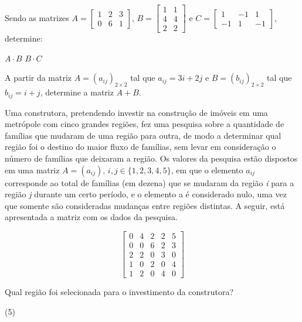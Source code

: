 \documentclass[a4paper,11pt,addpoints]{exam}
\begin{document}
\begin{questions}
	\question[1]

	Sendo as matrizes $A = \begin{bmatrix}
			1 & 2 & 3 \\
			0 & 6 & 1
		\end{bmatrix}$, $B = \begin{bmatrix}
			1 & 1 \\
			4 & 4 \\
			2 & 2
		\end{bmatrix}$ e $C = \begin{bmatrix}
			1  & -1 & 1  \\
			-1 & 1  & -1
		\end{bmatrix}$, determine:

	\begin{tasks}
		\task $A \cdot B$
		\task $B \cdot C$
	\end{tasks}

	\question[1]

	A partir da matriz $A = (a_{ij})_{2 \times 2}$ tal que $a_{ij} = 3i + 2j$
	e $B = (b_{ij})_{2 \times 2}$ tal que $b_{ij} = i + j$,
	determine a matriz $A + B$.

	\question[1]

	Uma construtora, pretendendo investir na construção de imóveis em uma
	metrópole com cinco grandes regiões, fez uma pesquisa sobre a quantidade
	de famílias que mudaram de uma região para outra, de modo a determinar
	qual região foi o destino do maior fluxo de famílias, sem levar em
	consideração o número de famílias que deixaram a região. Os valores da
	pesquisa estão dispostos em uma matriz $A = (a_{ij})$, $i,j \in \{1, 2, 3, 4, 5\}$,
	em que o elemento $a_{ij}$ corresponde ao total de famílias (em dezena)
	que se mudaram da região \textit{i} para a região \textit{j} durante
	um certo período, e o elemento a é considerado nulo, uma vez que somente
	são consideradas mudanças entre regiões distintas. A seguir, está
	apresentada a matriz com os dados da pesquisa.

	\begin{equation*}
		\begin{bmatrix}
			0 & 4 & 2 & 2 & 5 \\
			0 & 0 & 6 & 2 & 3 \\
			2 & 2 & 0 & 3 & 0 \\
			1 & 0 & 2 & 0 & 4 \\
			1 & 2 & 0 & 4 & 0
		\end{bmatrix}
	\end{equation*}

	Qual região foi selecionada para o investimento da construtora?

	\begin{tasks}(5)
		\task 1
		\task 2
		\task 3
		\task 4
		\task 5
	\end{tasks}



\end{questions}
\end{document}
